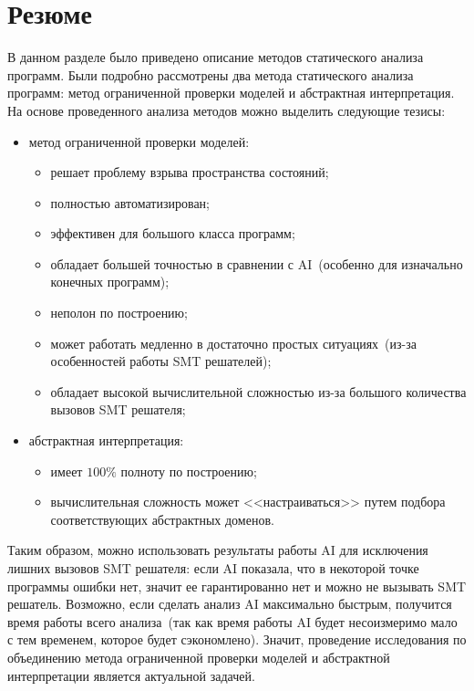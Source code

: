 \section{Резюме}
В данном разделе было приведено описание методов статического анализа 
программ. Были подробно рассмотрены два метода статического анализа программ: 
метод ограниченной проверки моделей и
абстрактная интерпретация. На основе проведенного анализа методов можно 
выделить следующие тезисы:
\begin{itemize}
\item метод ограниченной проверки моделей:
	\begin{itemize}
	\item решает проблему взрыва пространства состояний;
	\item полностью автоматизирован;
	\item эффективен для большого класса программ;
	\item обладает большей точностью в сравнении с AI~(особенно для изначально 
	конечных программ);
	\item неполон по построению;
	\item может работать медленно в достаточно простых ситуациях~(из-за 
	особенностей работы SMT решателей);
	\item обладает высокой вычислительной сложностью из-за большого количества
	вызовов SMT решателя;
	\end{itemize}
\item абстрактная интерпретация:
	\begin{itemize}
	\item имеет $100\%$ полноту по построению;
	\item вычислительная сложность может <<настраиваться>> путем подбора
	соответствующих абстрактных доменов.
	\end{itemize}
\end{itemize}

Таким образом, можно использовать результаты работы AI для исключения 
лишних вызовов SMT решателя: если AI показала, что в некоторой точке программы 
ошибки нет, значит ее гарантированно нет и можно не вызывать SMT решатель. 
Возможно, если сделать анализ AI максимально быстрым, получится время работы 
всего анализа~(так как время работы AI будет несоизмеримо мало с тем временем, 
которое будет сэкономлено). Значит, проведение исследования по объединению 
метода ограниченной проверки моделей и абстрактной интерпретации является 
актуальной задачей.